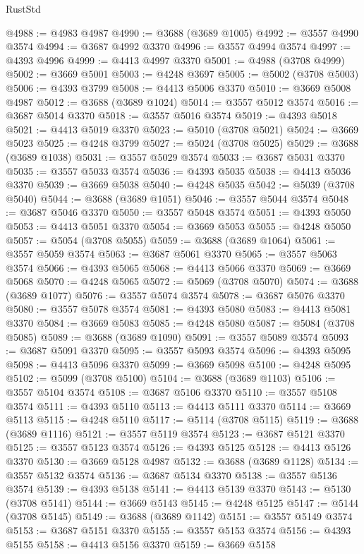 \begin{lexlean}{RustStd}
\begin{coremodule}
@4988 := @4983 @4987
@4990 := @3688 (@3689 @1005)
@4992 := @3557 @4990 @3574
@4994 := @3687 @4992 @3370
@4996 := @3557 @4994 @3574
@4997 := @4393 @4996
@4999 := @4413 @4997 @3370
@5001 := @4988 (@3708 @4999)
@5002 := @3669 @5001
@5003 := @4248 @3697
@5005 := @5002 (@3708 @5003)
@5006 := @4393 @3799
@5008 := @4413 @5006 @3370
@5010 := @3669 @5008 @4987
@5012 := @3688 (@3689 @1024)
@5014 := @3557 @5012 @3574
@5016 := @3687 @5014 @3370
@5018 := @3557 @5016 @3574
@5019 := @4393 @5018
@5021 := @4413 @5019 @3370
@5023 := @5010 (@3708 @5021)
@5024 := @3669 @5023
@5025 := @4248 @3799
@5027 := @5024 (@3708 @5025)
@5029 := @3688 (@3689 @1038)
@5031 := @3557 @5029 @3574
@5033 := @3687 @5031 @3370
@5035 := @3557 @5033 @3574
@5036 := @4393 @5035
@5038 := @4413 @5036 @3370
@5039 := @3669 @5038
@5040 := @4248 @5035
@5042 := @5039 (@3708 @5040)
@5044 := @3688 (@3689 @1051)
@5046 := @3557 @5044 @3574
@5048 := @3687 @5046 @3370
@5050 := @3557 @5048 @3574
@5051 := @4393 @5050
@5053 := @4413 @5051 @3370
@5054 := @3669 @5053
@5055 := @4248 @5050
@5057 := @5054 (@3708 @5055)
@5059 := @3688 (@3689 @1064)
@5061 := @3557 @5059 @3574
@5063 := @3687 @5061 @3370
@5065 := @3557 @5063 @3574
@5066 := @4393 @5065
@5068 := @4413 @5066 @3370
@5069 := @3669 @5068
@5070 := @4248 @5065
@5072 := @5069 (@3708 @5070)
@5074 := @3688 (@3689 @1077)
@5076 := @3557 @5074 @3574
@5078 := @3687 @5076 @3370
@5080 := @3557 @5078 @3574
@5081 := @4393 @5080
@5083 := @4413 @5081 @3370
@5084 := @3669 @5083
@5085 := @4248 @5080
@5087 := @5084 (@3708 @5085)
@5089 := @3688 (@3689 @1090)
@5091 := @3557 @5089 @3574
@5093 := @3687 @5091 @3370
@5095 := @3557 @5093 @3574
@5096 := @4393 @5095
@5098 := @4413 @5096 @3370
@5099 := @3669 @5098
@5100 := @4248 @5095
@5102 := @5099 (@3708 @5100)
@5104 := @3688 (@3689 @1103)
@5106 := @3557 @5104 @3574
@5108 := @3687 @5106 @3370
@5110 := @3557 @5108 @3574
@5111 := @4393 @5110
@5113 := @4413 @5111 @3370
@5114 := @3669 @5113
@5115 := @4248 @5110
@5117 := @5114 (@3708 @5115)
@5119 := @3688 (@3689 @1116)
@5121 := @3557 @5119 @3574
@5123 := @3687 @5121 @3370
@5125 := @3557 @5123 @3574
@5126 := @4393 @5125
@5128 := @4413 @5126 @3370
@5130 := @3669 @5128 @4987
@5132 := @3688 (@3689 @1128)
@5134 := @3557 @5132 @3574
@5136 := @3687 @5134 @3370
@5138 := @3557 @5136 @3574
@5139 := @4393 @5138
@5141 := @4413 @5139 @3370
@5143 := @5130 (@3708 @5141)
@5144 := @3669 @5143
@5145 := @4248 @5125
@5147 := @5144 (@3708 @5145)
@5149 := @3688 (@3689 @1142)
@5151 := @3557 @5149 @3574
@5153 := @3687 @5151 @3370
@5155 := @3557 @5153 @3574
@5156 := @4393 @5155
@5158 := @4413 @5156 @3370
@5159 := @3669 @5158

\end{coremodule}
\end{lexlean}
